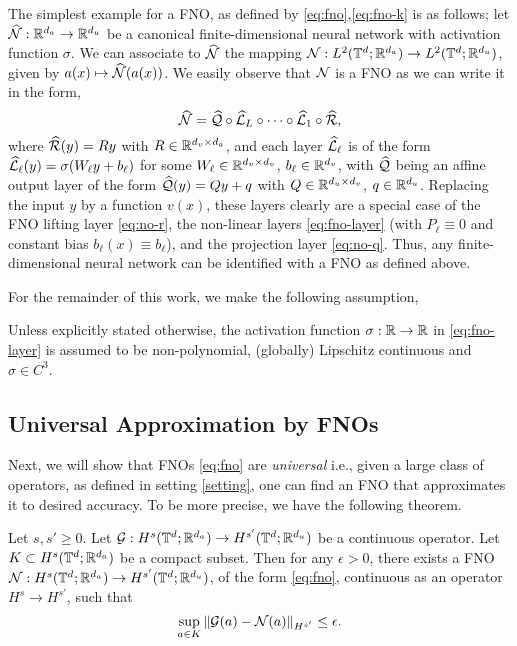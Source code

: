 \documentclass[reqno,a4paper]{amsart}
\begin{document}
\begin{remark}
\label{rem:loc}
The simplest example for a FNO, as defined by \eqref{eq:fno},\eqref{eq:fno-k} is as follows; let $\widehat{\mathcal{N}}: \mathbb{R}^{d_a} \to \mathbb{R}^{d_u}$ be a canonical finite-dimensional neural network with activation function $\sigma$. We can associate to $\widehat{\mathcal{N}}$ the mapping $\mathcal{N}: L^2(\mathbb{T}^d; \mathbb{R}^{d_a}) \to L^2(\mathbb{T}^d;\mathbb{R}^{d_u})$, given by $a(x) \mapsto \widehat{\mathcal{N}}(a(x))$. We easily observe that $\mathcal{N}$ is a FNO as we can write it in the form,
\[
\widehat{\mathcal{N}} = \widehat{\mathcal{Q}} \circ \widehat{\mathcal{L}}_L \circ \dots \circ \widehat{\mathcal{L}}_1 \circ \widehat{\mathcal{R}},
\]
where $\widehat{\mathcal{R}}(y) = Ry$ with $R \in \mathbb{R}^{d_v\times d_a}$, and each layer $\widehat{\mathcal{L}}_\ell$ is of the form $\widehat{\mathcal{L}}_\ell(y) = \sigma(W_\ell y + b_\ell)$ for some $W_\ell \in \mathbb{R}^{d_v \times d_v}$, $b_\ell \in \mathbb{R}^{d_v}$, with $\widehat{\mathcal{Q}}$ being an affine output layer of the form $\widehat{\mathcal{Q}}(y) = Qy + q$ with $Q\in \mathbb{R}^{d_u\times d_v}$, $q\in \mathbb{R}^{d_u}$. Replacing the input $y$ by a function $v(x)$, these layers clearly are a special case of the FNO lifting layer \eqref{eq:no-r}, the non-linear layers \eqref{eq:fno-layer} (with $P_\ell \equiv 0$ and constant bias $b_\ell(x)\equiv b_\ell$), and the projection layer \eqref{eq:no-q}. Thus, any finite-dimensional neural network can be identified with a FNO as defined above. 
\end{remark}

For the remainder of this work, we make the following assumption,

\begin{assumption}
Unless explicitly stated otherwise, the activation function $\sigma: \mathbb{R} \to \mathbb{R}$ in \eqref{eq:fno-layer} is assumed to be non-polynomial, (globally) Lipschitz continuous and $\sigma \in C^3$.
\end{assumption}


\subsection{Universal Approximation by FNOs}
Next, we will show that FNOs \eqref{eq:fno} are \emph{universal} i.e., given a large class of operators, as defined in setting \ref{setting}, one can find an FNO that approximates it to desired accuracy. To be more precise, we have the following theorem. 
\begin{theorem}
\label{thm:universal}
Let $s,s'\ge 0$. Let $\mathcal{G}: H^{s}(\mathbb{T}^d;\mathbb{R}^{d_a}) \to H^{s'}(\mathbb{T}^d;\mathbb{R}^{d_u})$ be a continuous operator. Let $K\subset H^{s}(\mathbb{T}^d;\mathbb{R}^{d_a})$ be a compact subset. Then for any $\epsilon > 0$, there exists a FNO $\mathcal{N}: H^{s}(\mathbb{T}^d;\mathbb{R}^{d_a}) \to H^{s'}(\mathbb{T}^d;\mathbb{R}^{d_u})$, of the form \eqref{eq:fno}, continuous as an operator $H^s\to H^{s'}$, such that 
\[
\sup_{a\in K}
\Vert 
\mathcal{G}(a) - \mathcal{N}(a)
\Vert_{H^{s'}}
\le \epsilon.
\]
\end{theorem}
\end{document}
